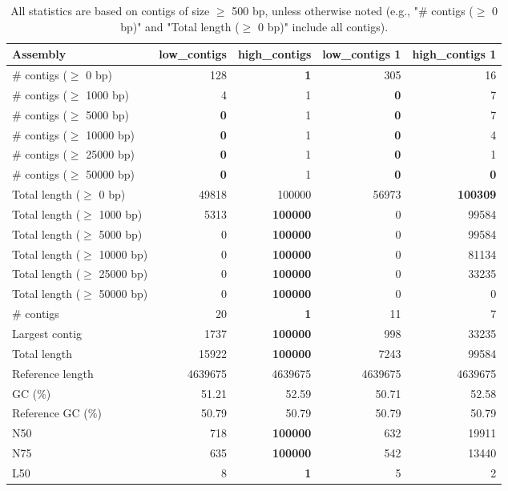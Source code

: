 \documentclass[12pt,a4paper]{article}
\begin{document}
\begin{table}[ht]
\begin{center}
\caption{All statistics are based on contigs of size $\geq$ 500 bp, unless otherwise noted (e.g., "\# contigs ($\geq$ 0 bp)" and "Total length ($\geq$ 0 bp)" include all contigs).}
\begin{tabular}{|l*{4}{|r}|}
\hline
Assembly & low\_contigs & high\_contigs & low\_contigs 1 & high\_contigs 1 \\ \hline
\# contigs ($\geq$ 0 bp) & 128 & {\bf 1} & 305 & 16 \\ \hline
\# contigs ($\geq$ 1000 bp) & 4 & 1 & {\bf 0} & 7 \\ \hline
\# contigs ($\geq$ 5000 bp) & {\bf 0} & 1 & {\bf 0} & 7 \\ \hline
\# contigs ($\geq$ 10000 bp) & {\bf 0} & 1 & {\bf 0} & 4 \\ \hline
\# contigs ($\geq$ 25000 bp) & {\bf 0} & 1 & {\bf 0} & 1 \\ \hline
\# contigs ($\geq$ 50000 bp) & {\bf 0} & 1 & {\bf 0} & {\bf 0} \\ \hline
Total length ($\geq$ 0 bp) & 49818 & 100000 & 56973 & {\bf 100309} \\ \hline
Total length ($\geq$ 1000 bp) & 5313 & {\bf 100000} & 0 & 99584 \\ \hline
Total length ($\geq$ 5000 bp) & 0 & {\bf 100000} & 0 & 99584 \\ \hline
Total length ($\geq$ 10000 bp) & 0 & {\bf 100000} & 0 & 81134 \\ \hline
Total length ($\geq$ 25000 bp) & 0 & {\bf 100000} & 0 & 33235 \\ \hline
Total length ($\geq$ 50000 bp) & 0 & {\bf 100000} & 0 & 0 \\ \hline
\# contigs & 20 & {\bf 1} & 11 & 7 \\ \hline
Largest contig & 1737 & {\bf 100000} & 998 & 33235 \\ \hline
Total length & 15922 & {\bf 100000} & 7243 & 99584 \\ \hline
Reference length & 4639675 & 4639675 & 4639675 & 4639675 \\ \hline
GC (\%) & 51.21 & 52.59 & 50.71 & 52.58 \\ \hline
Reference GC (\%) & 50.79 & 50.79 & 50.79 & 50.79 \\ \hline
N50 & 718 & {\bf 100000} & 632 & 19911 \\ \hline
N75 & 635 & {\bf 100000} & 542 & 13440 \\ \hline
L50 & 8 & {\bf 1} & 5 & 2 \\ \hline

\end{tabular}
\end{center}
\end{table}
\end{document}
